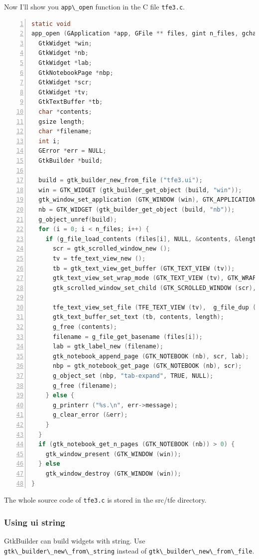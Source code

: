 Now I'll show you \passthrough{\lstinline!app\_open!} function in the C
file \passthrough{\lstinline!tfe3.c!}.

\begin{lstlisting}[language=C, numbers=left]
static void
app_open (GApplication *app, GFile ** files, gint n_files, gchar *hint) {
  GtkWidget *win;
  GtkWidget *nb;
  GtkWidget *lab;
  GtkNotebookPage *nbp;
  GtkWidget *scr;
  GtkWidget *tv;
  GtkTextBuffer *tb;
  char *contents;
  gsize length;
  char *filename;
  int i;
  GError *err = NULL;
  GtkBuilder *build;

  build = gtk_builder_new_from_file ("tfe3.ui");
  win = GTK_WIDGET (gtk_builder_get_object (build, "win"));
  gtk_window_set_application (GTK_WINDOW (win), GTK_APPLICATION (app));
  nb = GTK_WIDGET (gtk_builder_get_object (build, "nb"));
  g_object_unref(build);
  for (i = 0; i < n_files; i++) {
    if (g_file_load_contents (files[i], NULL, &contents, &length, NULL, &err)) {
      scr = gtk_scrolled_window_new ();
      tv = tfe_text_view_new ();
      tb = gtk_text_view_get_buffer (GTK_TEXT_VIEW (tv));
      gtk_text_view_set_wrap_mode (GTK_TEXT_VIEW (tv), GTK_WRAP_WORD_CHAR);
      gtk_scrolled_window_set_child (GTK_SCROLLED_WINDOW (scr), tv);

      tfe_text_view_set_file (TFE_TEXT_VIEW (tv),  g_file_dup (files[i]));
      gtk_text_buffer_set_text (tb, contents, length);
      g_free (contents);
      filename = g_file_get_basename (files[i]);
      lab = gtk_label_new (filename);
      gtk_notebook_append_page (GTK_NOTEBOOK (nb), scr, lab);
      nbp = gtk_notebook_get_page (GTK_NOTEBOOK (nb), scr);
      g_object_set (nbp, "tab-expand", TRUE, NULL);
      g_free (filename);
    } else {
      g_printerr ("%s.\n", err->message);
      g_clear_error (&err);
    }
  }
  if (gtk_notebook_get_n_pages (GTK_NOTEBOOK (nb)) > 0) {
    gtk_window_present (GTK_WINDOW (win));
  } else
    gtk_window_destroy (GTK_WINDOW (win));
}
\end{lstlisting}

The whole source code of \passthrough{\lstinline!tfe3.c!} is stored in
the src/tfe directory.

\subsubsection{Using ui string}\label{using-ui-string}

GtkBuilder can build widgets with string. Use
\passthrough{\lstinline!gtk\_builder\_new\_from\_string!} instead of
\passthrough{\lstinline!gtk\_builder\_new\_from\_file!}.

